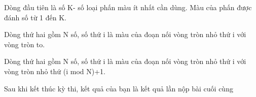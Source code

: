 Dòng đầu tiên là số K- số loại phấn màu ít nhất cần dùng. Màu của phấn được đánh số từ 1 đến K.  

   Dòng thứ hai gồm N số, số thứ i là màu của đoạn nối vòng tròn nhỏ thứ i với vòng tròn to.  

   Dòng thứ hai gồm N số, số thứ i là màu của đoạn nối vòng tròn nhỏ thứ i với vòng tròn nhỏ thứ (i mod N)+1.  

    Sau khi kết thúc kỳ thi, kết quả của bạn là kết quả lần nộp bài cuối cùng